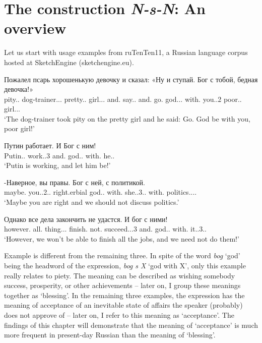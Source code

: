 \documentclass[output=paper]{langscibook}
\begin{document}
\section{The construction \textit{N-s-N}: An overview}

Let us start with usage examples from ruTenTen11, a Russian language corpus hosted at SketchEngine (sketchengine.eu).


\ea\label{ex:mikhailov:3}
\ea\label{ex:mikhailov:3a}
\gll  Пожалел псарь хорошенькую девочку и сказал: «Ну и ступай. Бог с тобой, бедная девочка!»\\
     pity.{\PAST}.{\glossM}{\SG} dog{}-trainer.{\NOUN}.{\NOM}.{\SG} pretty.{\ADJ}.{\ACC} girl.{\NOUN}.{\ACC}.{\SG} and.{\CONJ} say.{\PAST}.{\PTCP} and.{\PTCP} go.{\IMP} god.{\NOUN}.{\NOM}.{\SG} with.{\PREP} you.{\PRON}.2 poor.{\ADJ}.{\NOM}{\glossF}{\SG} girl.{\NOUN}.{\NOM}.{\SG}\\
\glt `The dog-trainer took pity on the pretty girl and he said: Go. God be with you, poor girl!'

\ex
\gll Путин работает. И Бог с ним!\\
     Putin.{\NOUNPROPER}.{\NOM} work.{\PRES}.3{\SG} and.{\PTCP} god.{\NOUN}.{\NOM} with.{\PREP} he.{\PRON}.{\INSTR}\\
\glt `Putin is working, and let him be!'

\ex
\gll
    -Наверное, вы правы. Бог с ней, с политикой.\\
     maybe.{\ADV} you.{\PRON}.2.{\NOM}.{\PL} right.{\ADV}erbial god.{\NOUN}.{\NOM} with.{\PREP} she.{\PRON}.3{\glossF}.{\INSTR}.{\SG} with.{\PREP} politics.{\NOUN}.{\glossF}.{\INSTR}.{\SG}\\
\glt `Maybe you are right and we should not discuss politics.'


\ex
\gll  Однако все дела закончить не удастся. И бог с ними!\\
     however.{\ADV} all.{\PRON} thing.{\NOUN}.{\PL}.{\ACC} finish.{\glossINF} not.{\PTCP} succeed.{\REFL}.{\FUT}.3{\SG} and.{\PTCP} god.{\NOUN}.{\NOM} with.{\PREP} it.{\PRON}.3.{\PL}.{\INSTR}\\
\glt `However, we won’t be able to finish all the jobs, and we need not do them!'
\z
\z

Example  is different from the remaining three. In spite of the word \textit{bog} ‘god’ being the headword of the expression, \textit{bog s X} ‘god with X’, only this example really relates to piety. The meaning can be described as wishing somebody success, prosperity, or other achievements – later on, I group these meanings together as ‘blessing’. In the remaining three examples, the expression has the meaning of acceptance of an inevitable state of affairs the speaker (probably) does not approve of – later on, I refer to this meaning as ‘acceptance’. The findings of this chapter will demonstrate that the meaning of ‘acceptance’ is much more frequent in present-day Russian than the meaning of ‘blessing’.
\end{document}
